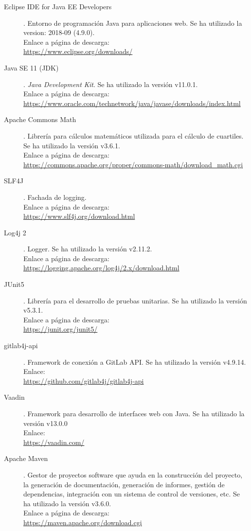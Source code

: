 \begin{description}
	\item[Eclipse IDE for Java EE Developers]. Entorno de programación Java para aplicaciones web. Se ha utilizado la version: 2018-09 (4.9.0).\\ Enlace a página de descarga:\\ \url{https://www.eclipse.org/downloads/}
	\item[Java SE 11 (JDK)]. \textit{Java Development Kit}. Se ha utilizado la versión  v11.0.1.\\ Enlace a página de descarga:\\ \url{https://www.oracle.com/technetwork/java/javase/downloads/index.html}
	\item[Apache Commons Math]. Librería para cálculos matemáticos utilizada para el cálculo de cuartiles. Se ha utilizado la versión  v3.6.1.\\ Enlace a página de descarga:\\ \url{https://commons.apache.org/proper/commons-math/download_math.cgi}
	\item[SLF4J]. Fachada de logging.\\ Enlace a página de descarga:\\ \url{https://www.slf4j.org/download.html}
	\item[Log4j 2]. Logger. Se ha utilizado la versión  v2.11.2.\\ Enlace a página de descarga:\\ \url{https://logging.apache.org/log4j/2.x/download.html}
	\item[JUnit5]. Librería para el desarrollo de pruebas unitarias. Se ha utilizado la versión  v5.3.1.\\ Enlace a página de descarga:\\ \url{https://junit.org/junit5/}
	\item[gitlab4j-api]. Framework de conexión a GitLab API. Se ha utilizado la versión  v4.9.14.\\ Enlace:\\ \url{https://github.com/gitlab4j/gitlab4j-api}
	\item[Vaadin]. Framework para desarrollo de interfaces web con Java. Se ha utilizado la versión  v13.0.0\\ Enlace:\\ \url{https://vaadin.com/}
	\item[Apache Maven]. Gestor de proyectos software que ayuda en la construcción del proyecto, la generación de documentación, generación de informes, gestión de dependencias, integración con un sistema de control de versiones, etc. Se ha utilizado la versión  v3.6.0.\\ Enlace a página de descarga:\\ \url{https://maven.apache.org/download.cgi}

\end{description}
